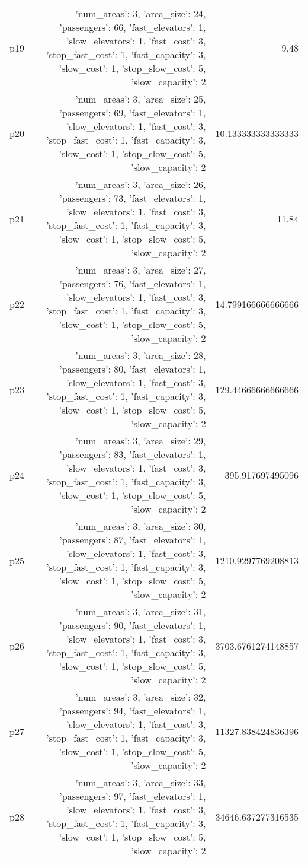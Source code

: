 \documentclass{article}
\begin{document}
\begin{center}
\begin{tabular}{r|r|r}
  p19&{'num\_areas': 3, 'area\_size': 24, 'passengers': 66, 'fast\_elevators': 1, 'slow\_elevators': 1, 'fast\_cost': 3, 'stop\_fast\_cost': 1, 'fast\_capacity': 3, 'slow\_cost': 1, 'stop\_slow\_cost': 5, 'slow\_capacity': 2}&9.48\\
  p20&{'num\_areas': 3, 'area\_size': 25, 'passengers': 69, 'fast\_elevators': 1, 'slow\_elevators': 1, 'fast\_cost': 3, 'stop\_fast\_cost': 1, 'fast\_capacity': 3, 'slow\_cost': 1, 'stop\_slow\_cost': 5, 'slow\_capacity': 2}&10.133333333333333\\
  p21&{'num\_areas': 3, 'area\_size': 26, 'passengers': 73, 'fast\_elevators': 1, 'slow\_elevators': 1, 'fast\_cost': 3, 'stop\_fast\_cost': 1, 'fast\_capacity': 3, 'slow\_cost': 1, 'stop\_slow\_cost': 5, 'slow\_capacity': 2}&11.84\\
  p22&{'num\_areas': 3, 'area\_size': 27, 'passengers': 76, 'fast\_elevators': 1, 'slow\_elevators': 1, 'fast\_cost': 3, 'stop\_fast\_cost': 1, 'fast\_capacity': 3, 'slow\_cost': 1, 'stop\_slow\_cost': 5, 'slow\_capacity': 2}&14.799166666666666\\
  p23&{'num\_areas': 3, 'area\_size': 28, 'passengers': 80, 'fast\_elevators': 1, 'slow\_elevators': 1, 'fast\_cost': 3, 'stop\_fast\_cost': 1, 'fast\_capacity': 3, 'slow\_cost': 1, 'stop\_slow\_cost': 5, 'slow\_capacity': 2}&129.44666666666666\\
  p24&{'num\_areas': 3, 'area\_size': 29, 'passengers': 83, 'fast\_elevators': 1, 'slow\_elevators': 1, 'fast\_cost': 3, 'stop\_fast\_cost': 1, 'fast\_capacity': 3, 'slow\_cost': 1, 'stop\_slow\_cost': 5, 'slow\_capacity': 2}&395.917697495096\\
  p25&{'num\_areas': 3, 'area\_size': 30, 'passengers': 87, 'fast\_elevators': 1, 'slow\_elevators': 1, 'fast\_cost': 3, 'stop\_fast\_cost': 1, 'fast\_capacity': 3, 'slow\_cost': 1, 'stop\_slow\_cost': 5, 'slow\_capacity': 2}&1210.9297769208813\\
  p26&{'num\_areas': 3, 'area\_size': 31, 'passengers': 90, 'fast\_elevators': 1, 'slow\_elevators': 1, 'fast\_cost': 3, 'stop\_fast\_cost': 1, 'fast\_capacity': 3, 'slow\_cost': 1, 'stop\_slow\_cost': 5, 'slow\_capacity': 2}&3703.6761274148857\\
  p27&{'num\_areas': 3, 'area\_size': 32, 'passengers': 94, 'fast\_elevators': 1, 'slow\_elevators': 1, 'fast\_cost': 3, 'stop\_fast\_cost': 1, 'fast\_capacity': 3, 'slow\_cost': 1, 'stop\_slow\_cost': 5, 'slow\_capacity': 2}&11327.838424836396\\
  p28&{'num\_areas': 3, 'area\_size': 33, 'passengers': 97, 'fast\_elevators': 1, 'slow\_elevators': 1, 'fast\_cost': 3, 'stop\_fast\_cost': 1, 'fast\_capacity': 3, 'slow\_cost': 1, 'stop\_slow\_cost': 5, 'slow\_capacity': 2}&34646.637277316535\\

\end{tabular}
\end{center}
\end{document}
